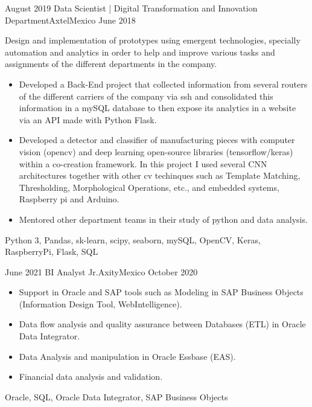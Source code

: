 \begin{experiences}
  
  \experience
    {August 2019} {Data Scientist | Digital Transformation and Innovation Department}{Axtel}{Mexico}
    {June 2018}    {
    			Design and implementation of prototypes using emergent technologies, specially automation
			and analytics in order to help and improve various tasks and assignments of the different departments in the company.
                      \begin{itemize}
                        \item Developed a Back-End project that collected information from several routers
                        of the different carriers of the company via ssh and consolidated this information in a
                        mySQL database to then expose its analytics in a website via an API made with
                        Python Flask.           
                        \item Developed a detector and classifier of manufacturing pieces with computer vision (opencv)
                        and deep learning open-source libraries (tensorflow/keras) within a co-creation framework.
                        In this project I used several CNN architectures together with other cv techinques such as
                        Template Matching, Thresholding, Morphological Operations, etc., and embedded systems, Raspberry pi and Arduino.
                        \item Mentored other department teams in their study of python and data analysis.
                      \end{itemize}
                    }
                    {Python 3, Pandas, sk-learn, scipy, seaborn, mySQL, OpenCV, Keras, RaspberryPi, Flask, SQL}
  \emptySeparator
  
  \experience
    {June 2021} {BI Analyst Jr.}{Axity}{Mexico}
    {October 2020}    {
                      \begin{itemize}
                        \item Support in Oracle and SAP tools such as Modeling in SAP Business Objects (Information Design Tool, WebIntelligence).
                        \item Data flow analysis and quality assurance between Databases (ETL) in Oracle Data Integrator.
                        \item Data Analysis and manipulation in Oracle Essbase (EAS).
                        \item Financial data analysis and validation.
                      \end{itemize}
                    }
                    {Oracle, SQL, Oracle Data Integrator, SAP Business Objects}
  \emptySeparator
  

\end{experiences}
